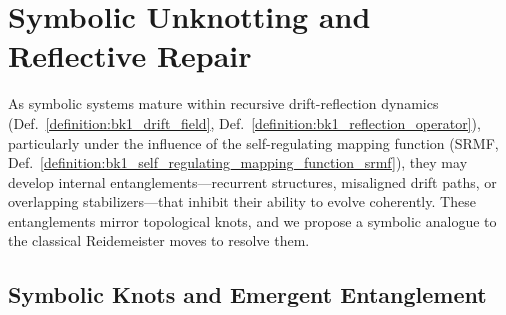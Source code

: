 \section[Symbolic Unknotting]{Symbolic Unknotting and Reflective Repair}
\label{sec:bk8_symbolic_unknotting}
As symbolic systems mature within recursive drift-reflection dynamics (Def.~\ref{definition:bk1_drift_field}, Def.~\ref{definition:bk1_reflection_operator}), particularly under the influence of the self-regulating mapping function (SRMF, Def.~\ref{definition:bk1_self_regulating_mapping_function_srmf}), they may develop internal entanglements—recurrent structures, misaligned drift paths, or overlapping stabilizers—that inhibit their ability to evolve coherently. These entanglements mirror topological knots, and we propose a symbolic analogue to the classical Reidemeister moves to resolve them.
\subsection{Symbolic Knots and Emergent Entanglement}
\label{subsec:bk8_symbolic_knots_and_emergent_entanglement}


